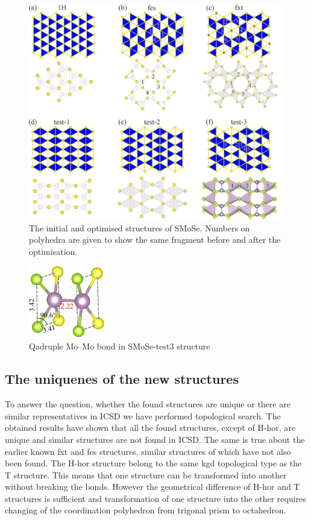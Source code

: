 \documentclass[a4paperm]{article}
\begin{document}
\begin{figure}[H] \centering
        \includegraphics[width=\textwidth]{H-based.png}
        \caption{The initial and optimised structures of SMoSe. Numbers on polyhedra are given to show the same fragment before and after the optimisation.}
\label{H-based}
\end{figure}

\begin{figure}[H]
	\includegraphics[width=0.3\textwidth]{test3_momo.png}
	\caption{Qadruple Mo--Mo bond in SMoSe-test3 structure}
\label{test3_momo}
\end{figure}








\subsection{The uniquenes of the new structures}

To answer the question, whether the found structures are unique or there are similar representatives in ICSD we have performed topological search.
The obtained results have shown that all the found structures, except of H-hor, are unique and similar structures are not found in ICSD.
The same is true about the earlier known fxt and fes structures, similar structures of which have not also been found. 
The H-hor structure belong to the same kgd topological type as the T structure.
This means that one structure can be transformed into another without breaking the bonds.
However the geometrical difference of H-hor and T structures is sufficient and transformation of one structure into the other requires changing of the coordination polyhedron from trigonal prism to octahedron.
\end{document}
